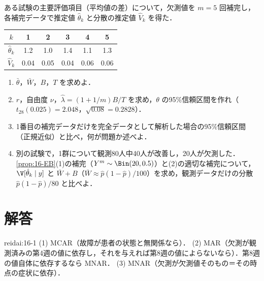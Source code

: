 \begin{reidai}[多重補完の統合]\label{reidai:16-4}
ある試験の主要評価項目（平均値の差）について，欠測値を $m=5$ 回補完し，各補完データで推定値 $\hat\theta_k$ と分散の推定値 $\hat V_k$ を得た．
\begin{center}\small
\begin{tabular}{@{}cccccc@{}}
\toprule
$k$ & 1 & 2 & 3 & 4 & 5\\
\midrule
$\hat\theta_k$ & 1.2 & 1.0 & 1.4 & 1.1 & 1.3\\
$\hat V_k$ & 0.04 & 0.05 & 0.04 & 0.06 & 0.06\\
\bottomrule
\end{tabular}
\end{center}
\begin{enumerate}[label=(\arabic*)]
\item $\bar\theta$，$\bar W$，$B$，$T$ を求めよ．
\item $r$，自由度 $\nu$，$\hat\lambda=(1+1/m)B/T$ を求め，$\theta$ の95\%信頼区間を作れ（$t_{28}(0.025)=2.048$，$\sqrt{0.08}=0.2828$）．
\item 1番目の補完データだけを完全データとして解析した場合の95\%信頼区間（正規近似）と比べ，何が問題か述べよ．
\item 別の試験で，1群について観測80人中40人が改善し，20人が欠測した．\cref{prop:16-EB}(1)の補完（$Y^m\sim\Bin(20,0.5)$）と(2)の適切な補完について，$\V[\hat\theta_k\mid y]$ と $\bar W+B$（$\bar W\approx\hat p(1-\hat p)/100$）を求め，観測データだけの分散 $\hat p(1-\hat p)/80$ と比べよ．
\end{enumerate}
\end{reidai}

\section{解答}\label{sec:16-sol}
\begin{kaitou}{reidai:16-1}
(1) MCAR（故障が患者の状態と無関係なら）．
(2) MAR（欠測が観測済みの第4週の値に依存し，それを与えれば第8週の値によらないなら）．第8週の値自体に依存するなら MNAR．
(3) MNAR（欠測が欠測値そのもの＝その時点の症状に依存）．
\end{kaitou}

